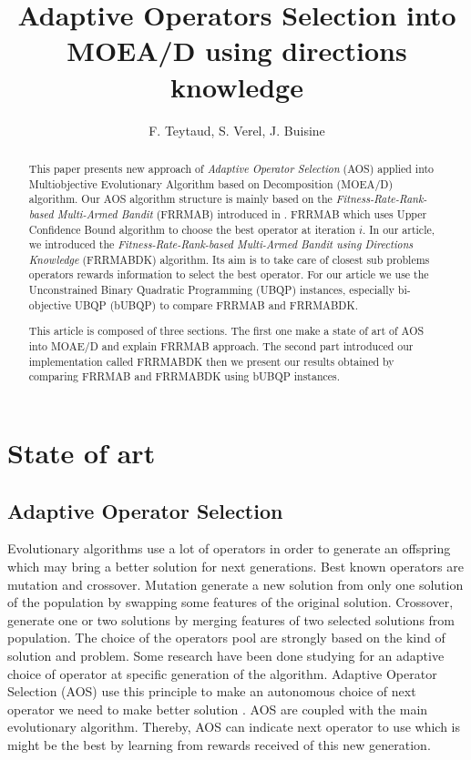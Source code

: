 \documentclass{article}
\title{\textbf{Adaptive Operators Selection into MOEA/D using directions knowledge}}
\author{F. Teytaud, S. Verel, J. Buisine}
\date{}
\begin{document}
    \maketitle

    \vspace{30mm}

    \tableofcontents
    \newpage

    \begin{abstract}
        This paper presents new approach of \textit{Adaptive Operator Selection} (AOS) applied into Multiobjective Evolutionary Algorithm based on Decomposition (MOEA/D) algorithm. Our AOS algorithm structure is mainly based on the \textit{Fitness-Rate-Rank-based Multi-Armed Bandit} (FRRMAB) introduced in \citep{DBLP:journals/tec/LiFKZ14}. FRRMAB which uses Upper Confidence Bound algorithm to choose the best operator at iteration $i$. In our article, we introduced the \textit{Fitness-Rate-Rank-based Multi-Armed Bandit using Directions Knowledge} (FRRMABDK) algorithm. Its aim is to take care of closest sub problems operators rewards information to select the best operator. For our article we use the Unconstrained Binary Quadratic Programming \citep{DBLP:journals/jco/KochenbergerHGLLWW14} (UBQP) instances, especially bi-objective UBQP (bUBQP) to compare FRRMAB and FRRMABDK.

        \vspace{3mm}

        This article is composed of three sections. The first one make a state of art of AOS into MOAE/D and explain FRRMAB approach. The second part introduced our implementation called FRRMABDK then we present our results obtained by comparing FRRMAB and FRRMABDK using bUBQP instances.

    \end{abstract}

    \section{State of art}

    \subsection{Adaptive Operator Selection}

    Evolutionary algorithms use a lot of operators in order to generate an offspring which may bring a better solution for next generations. Best known operators are mutation and crossover. Mutation generate a new solution from only one solution of the population by swapping some features of the original solution. Crossover, generate one or two solutions by merging features of two selected solutions from population. The choice of the operators pool are strongly based on the kind of solution and problem. Some research have been done studying for an adaptive choice of operator at specific generation of the algorithm. Adaptive Operator Selection (AOS) use this principle to make an autonomous choice of next operator we need to make better solution \citep{DBLP:phd/hal/Fialho10}. AOS are coupled with the main evolutionary algorithm. Thereby, AOS can indicate next operator to use which is might be the best by learning from rewards received of this new generation.
\end{document}
